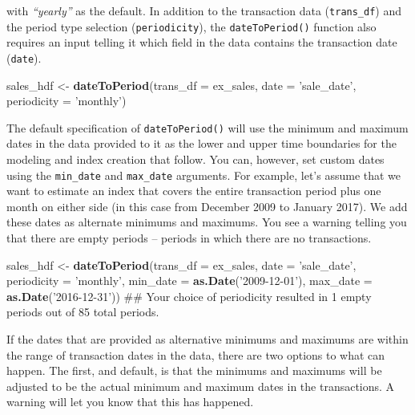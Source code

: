 \documentclass[]{article}
\newenvironment{Shaded}{\begin{snugshade}}{\end{snugshade}}
\newcommand{\KeywordTok}[1]{\textcolor[rgb]{0.13,0.29,0.53}{\textbf{#1}}}
\newcommand{\DataTypeTok}[1]{\textcolor[rgb]{0.13,0.29,0.53}{#1}}
\newcommand{\StringTok}[1]{\textcolor[rgb]{0.31,0.60,0.02}{#1}}
\newcommand{\NormalTok}[1]{#1}
\begin{document}
with \emph{``yearly''} as the default. In addition to the transaction
data (\texttt{trans\_df}) and the period type selection
(\texttt{periodicity}), the \texttt{dateToPeriod()} function also
requires an input telling it which field in the data contains the
transaction date (\texttt{date}).

\begin{Shaded}
\begin{Highlighting}[]
\NormalTok{  sales_hdf <-}\StringTok{ }\KeywordTok{dateToPeriod}\NormalTok{(}\DataTypeTok{trans_df =}\NormalTok{ ex_sales,}
                            \DataTypeTok{date =} \StringTok{'sale_date'}\NormalTok{,}
                            \DataTypeTok{periodicity =} \StringTok{'monthly'}\NormalTok{)}
\end{Highlighting}
\end{Shaded}

The default specification of \texttt{dateToPeriod()} will use the
minimum and maximum dates in the data provided to it as the lower and
upper time boundaries for the modeling and index creation that follow.
You can, however, set custom dates using the \texttt{min\_date} and
\texttt{max\_date} arguments. For example, let's assume that we want to
estimate an index that covers the entire transaction period plus one
month on either side (in this case from December 2009 to January 2017).
We add these dates as alternate minimums and maximums. You see a warning
telling you that there are empty periods -- periods in which there are
no transactions.

\begin{Shaded}
\begin{Highlighting}[]
\NormalTok{  sales_hdf <-}\StringTok{ }\KeywordTok{dateToPeriod}\NormalTok{(}\DataTypeTok{trans_df =}\NormalTok{ ex_sales,}
                            \DataTypeTok{date =} \StringTok{'sale_date'}\NormalTok{,}
                            \DataTypeTok{periodicity =} \StringTok{'monthly'}\NormalTok{,}
                            \DataTypeTok{min_date =} \KeywordTok{as.Date}\NormalTok{(}\StringTok{'2009-12-01'}\NormalTok{),}
                            \DataTypeTok{max_date =} \KeywordTok{as.Date}\NormalTok{(}\StringTok{'2016-12-31'}\NormalTok{))}
\NormalTok{## Your choice of periodicity resulted in 1 empty periods out of 85 total periods.}
\end{Highlighting}
\end{Shaded}

If the dates that are provided as alternative minimums and maximums are
within the range of transaction dates in the data, there are two options
to what can happen. The first, and default, is that the minimums and
maximums will be adjusted to be the actual minimum and maximum dates in
the transactions. A warning will let you know that this has happened.
\end{document}
